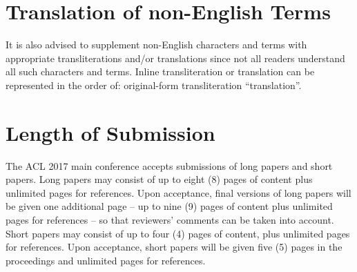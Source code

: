 \documentclass[11pt,a4paper]{article}
\begin{document}



\section{Translation of non-English Terms}

It is also advised to supplement non-English characters and terms
with appropriate transliterations and/or translations
since not all readers understand all such characters and terms.
Inline transliteration or translation can be represented in
the order of: original-form transliteration ``translation''.

\section{Length of Submission}
\label{sec:length}

The ACL 2017 main conference accepts submissions of long papers and
short papers.
 Long papers may consist of up to eight (8) pages of
content plus unlimited pages for references. Upon acceptance, final
versions of long papers will be given one additional page -- up to nine (9)
pages of content plus unlimited pages for references -- so that reviewers' comments
can be taken into account. Short papers may consist of up to four (4)
pages of content, plus unlimited pages for references. Upon
acceptance, short papers will be given five (5) pages in the
proceedings and unlimited pages for references. 
\end{document}
